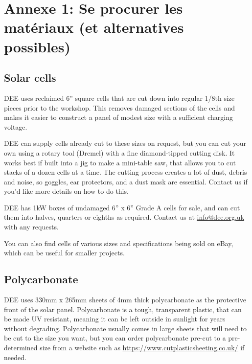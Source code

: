 \documentclass{article}
\theoremstyle{definition}
\theoremstyle{definition}
\theoremstyle{remark}
\begin{document}


\newpage

{\color{blue}\section{Annexe 1: Se procurer les matériaux (et alternatives possibles)}} %
\label{sec:appendix_1_se_procurer_les_materiaux_et_alternatives_possibles_}

  \subsection*{Solar cells} %
  \label{sub:solar_cells}

    DEE uses reclaimed 6” square cells that are cut down into regular 1/8th size pieces prior to the workshop. This removes damaged sections of the cells and makes it easier to construct a panel of modest size with a sufficient charging voltage. 

    DEE can supply cells already cut to these sizes on request, but you can cut your own using a rotary tool (Dremel) with a fine diamond-tipped cutting disk. It works best if built into a jig to make a mini-table saw, that allows you to cut stacks of a dozen cells at a time. The cutting process creates a lot of dust, debris and noise, so goggles, ear protectors, and a dust mask are essential. Contact us if you'd like more details on how to do this.

    DEE has 1kW boxes of undamaged 6” x 6” Grade A cells for sale, and can cut them into halves, quarters or eighths as required. Contact us at \href{mailto:info@dee.org.uk}{\underline{info@dee.org.uk}} with any requests.

    You can also find cells of various sizes and specifications being sold on eBay, which can be useful for smaller projects.
  

  \subsection*{Polycarbonate} %
  \label{sub:polycarbonate}

    DEE uses 330mm x 265mm sheets of 4mm thick polycarbonate as the protective front of the solar panel. Polycarbonate is a tough, transparent plastic, that can be made UV resistant, meaning it can be left outside in sunlight for years without degrading. Polycarbonate usually comes in large sheets that will need to be cut to the size you want, but you can order polycarbonate pre-cut to a pre-determined size from a website such as \href{https://www.cutplasticsheeting.co.uk/clear-acrylic-sheeting/clear-polycarbonate-sheet}{\underline{https://www.cutplasticsheeting.co.uk/}} if needed.
\end{document}
